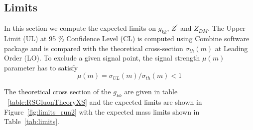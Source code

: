 \subsection{Limits}


In this section we compute the expected limits on $g_{kk}$, $ Z^{'}$ and $Z_{DM}$. The Upper Limit (UL) at 95 \% Confidence Level (CL) is computed using Combine software package and  is compared with the theoretical cross-section $\sigma_{th}(m)$ at Leading Order (LO).  To exclude a given signal point, the signal strength $\mu(m)$ parameter has to satisfy  
\begin{equation}
\mu(m) = \sigma_{UL}(m) / \sigma_{th}(m) < 1
\end{equation}
    


The theoretical cross section of the $g_{kk}$ are given in table ~\ref{table:RSGluonTheoryXS} and the expected limits are shown in Figure~\ref{fig:limits_run2} with the expected mass limits shown in Table~\ref{tab:limits}.
%	
%		
%		
%	

\newcommand{\ColTitle}[1]{\multicolumn{2}{|P{4cm}|}{\bf #1}} %
\newcommand{\ColMass}{\multicolumn{1}{|P{2cm}|}{\bf Mass $(TeV)$}}
\newcommand{\ColXS}{\multicolumn{1}{|P{2cm}|}{\bf$\sigma\ (pb)$}}


